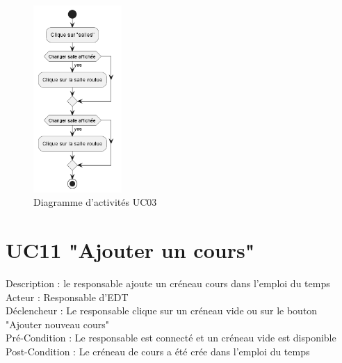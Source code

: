 \documentclass[12pt,a4paper]{article}
\begin{document}
\begin{figure}[h]
    \centering
    \includegraphics[width=0.3\textwidth]{Diag_activites_UC03.png}
    \caption{Diagramme d'activités UC03}
    \label{fig:act_03}
\end{figure}

\section{UC11 "Ajouter un cours"}
Description : le responsable ajoute un créneau cours dans l'emploi du temps\\
Acteur : Responsable d'EDT\\
Déclencheur : Le responsable clique sur un créneau vide ou sur le bouton "Ajouter nouveau cours"\\
Pré-Condition : Le responsable est connecté et un créneau vide est disponible\\
Post-Condition : Le créneau de cours a été crée dans l'emploi du temps\\
\end{document}
